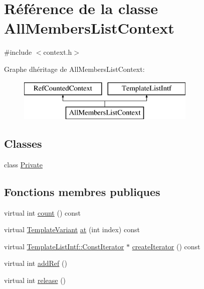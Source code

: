 \hypertarget{class_all_members_list_context}{}\section{Référence de la classe All\+Members\+List\+Context}
\label{class_all_members_list_context}


{\ttfamily \#include $<$context.\+h$>$}

Graphe d\textquotesingle{}héritage de All\+Members\+List\+Context\+:\begin{figure}[H]
\begin{center}
\leavevmode
\includegraphics[height=2.000000cm]{class_all_members_list_context}
\end{center}
\end{figure}
\subsection*{Classes}
\begin{DoxyCompactItemize}
\item 
class \hyperlink{class_all_members_list_context_1_1_private}{Private}
\end{DoxyCompactItemize}
\subsection*{Fonctions membres publiques}
\begin{DoxyCompactItemize}
\item 
virtual int \hyperlink{class_all_members_list_context_ab1e3a62415f70290d26e1262ca122cce}{count} () const 
\item 
virtual \hyperlink{class_template_variant}{Template\+Variant} \hyperlink{class_all_members_list_context_a9a99e8636452b1496b63230044324dea}{at} (int index) const 
\item 
virtual \hyperlink{class_template_list_intf_1_1_const_iterator}{Template\+List\+Intf\+::\+Const\+Iterator} $\ast$ \hyperlink{class_all_members_list_context_adb276e6f6735d87d2faa477e442eae63}{create\+Iterator} () const 
\item 
virtual int \hyperlink{class_all_members_list_context_ac1944fc9ad154caa5ed58e28f49c2461}{add\+Ref} ()
\item 
virtual int \hyperlink{class_all_members_list_context_a7b3690135afdc30e9e6f3e2dbb9265cc}{release} ()
\end{DoxyCompactItemize}
